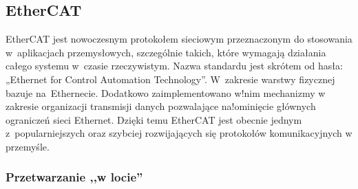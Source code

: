 \subsection{EtherCAT}

EtherCAT jest nowoczesnym protokołem sieciowym przeznaczonym do stosowania w~aplikacjach przemysłowych, szczególnie takich, które wymagają działania całego systemu w~czasie rzeczywistym. Nazwa standardu jest skrótem od hasła: „Ethernet for Control Automation Technology”. W~zakresie warstwy fizycznej bazuje na~Ethernecie. Dodatkowo zaimplementowano w!nim mechanizmy w zakresie organizacji transmisji danych pozwalające na!ominięcie głównych ograniczeń sieci Ethernet. Dzięki temu EtherCAT jest obecnie jednym z~popularniejszych oraz szybciej rozwijających się protokołów komunikacyjnych w przemyśle.

\subsubsection{Przetwarzanie ,,w locie''}

%


